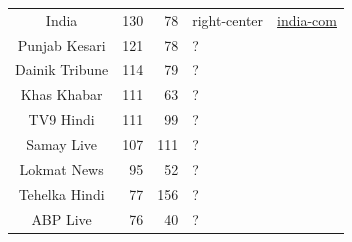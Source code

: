 \begin{table}[!htbp]
{\begin{tabular}{c|r|r|P{0.23\textwidth}|c}
            India           & 130                 & 78              & right-center                                                                                           & \href{https://mediabiasfactcheck.com/india-com/}{india-com}                                      \\
            Punjab Kesari   & 121                 & 78              & ?                                                                                                      &                                                                                                  \\
            Dainik Tribune  & 114                 & 79              & ?                                                                                                      &                                                                                                  \\
            Khas Khabar     & 111                 & 63              & ?                                                                                                      &                                                                                                  \\
            TV9 Hindi       & 111                 & 99              & ?                                                                                                      &                                                                                                  \\
            Samay Live      & 107                 & 111             & ?                                                                                                      &                                                                                                  \\
            Lokmat News     & 95                  & 52              & ?                                                                                                      &                                                                                                  \\
            Tehelka Hindi   & 77                  & 156             & ?                                                                                                      &                                                                                                  \\
            ABP Live        & 76                  & 40              & ?                                                                                                      &                                                                                                  \\

\end{tabular}}
\end{table}
